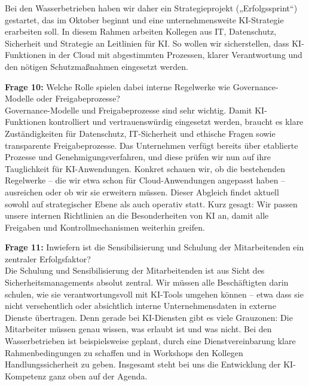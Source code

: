\documentclass[
    12pt, 
    a4paper,
    ]{scrartcl} %
\begin{document}
Bei den Wasserbetrieben haben wir daher ein Strategieprojekt („Erfolgssprint“) gestartet, das im Oktober beginnt und eine unternehmensweite KI-Strategie erarbeiten soll. In diesem Rahmen arbeiten Kollegen aus IT, Datenschutz, Sicherheit und Strategie an Leitlinien für KI. So wollen wir sicherstellen, dass KI-Funktionen in der Cloud mit abgestimmten Prozessen, klarer Verantwortung und den nötigen Schutzmaßnahmen eingesetzt werden.

\textbf{Frage 10:} Welche Rolle spielen dabei interne Regelwerke wie Governance-Modelle oder Freigabeprozesse? \\[0.5em]
Governance-Modelle und Freigabeprozesse sind sehr wichtig. Damit KI-Funktionen kontrolliert und vertrauenswürdig eingesetzt werden, braucht es klare Zuständigkeiten für Datenschutz, IT-Sicherheit und ethische Fragen sowie transparente Freigabeprozesse. Das Unternehmen verfügt bereits über etablierte Prozesse und Genehmigungsverfahren, und diese prüfen wir nun auf ihre Tauglichkeit für KI-Anwendungen. Konkret schauen wir, ob die bestehenden Regelwerke – die wir etwa schon für Cloud-Anwendungen angepasst haben – ausreichen oder ob wir sie erweitern müssen. Dieser Abgleich findet aktuell sowohl auf strategischer Ebene als auch operativ statt. Kurz gesagt: Wir passen unsere internen Richtlinien an die Besonderheiten von KI an, damit alle Freigaben und Kontrollmechanismen weiterhin greifen.

\textbf{Frage 11:} Inwiefern ist die Sensibilisierung und Schulung der Mitarbeitenden ein zentraler Erfolgsfaktor? \\[0.5em]
Die Schulung und Sensibilisierung der Mitarbeitenden ist aus Sicht des Sicherheitsmanagements absolut zentral. Wir müssen alle Beschäftigten darin schulen, wie sie verantwortungsvoll mit KI-Tools umgehen können – etwa dass sie nicht versehentlich oder absichtlich interne Unternehmensdaten in externe Dienste übertragen. Denn gerade bei KI-Diensten gibt es viele Grauzonen: Die Mitarbeiter müssen genau wissen, was erlaubt ist und was nicht. Bei den Wasserbetrieben ist beispielsweise geplant, durch eine Dienstvereinbarung klare Rahmenbedingungen zu schaffen und in Workshops den Kollegen Handlungssicherheit zu geben. Insgesamt steht bei uns die Entwicklung der KI-Kompetenz ganz oben auf der Agenda.
\end{document}
